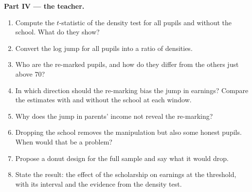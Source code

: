\begin{problem}
\medskip\noindent\textbf{Part IV --- the teacher.}
\begin{enumerate}[resume]
\item Compute the $t$-statistic of the density test for all pupils and without
the school. What do they show?
\item Convert the log jump for all pupils into a ratio of densities.
\item Who are the re-marked pupils, and how do they differ from the others just
above 70?
\item In which direction should the re-marking bias the jump in earnings? Compare
the estimates with and without the school at each window.
\item Why does the jump in parents' income not reveal the re-marking?
\item Dropping the school removes the manipulation but also some honest pupils.
When would that be a problem?
\item Propose a donut design for the full sample and say what it would drop.
\item State the result: the effect of the scholarship on earnings at the
threshold, with its interval and the evidence from the density test.
\end{enumerate}
\end{problem}
